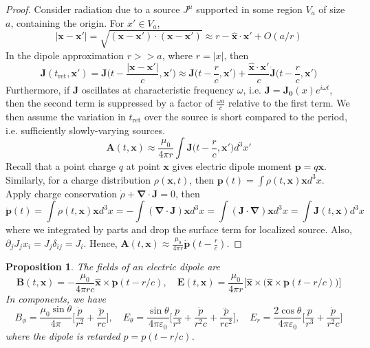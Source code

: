 \documentclass[a4paper]{article}
\theoremstyle{new}
\newtheorem{prop}{Proposition}[section]
\begin{document}
\begin{proof}
Consider radiation due to a source $J^\mu$ supported in some region $V_a$ of size $a$, containing the origin. For $x'\in V_a$,
$$|\mathbf{x}-\mathbf{x'}|=\sqrt{(\mathbf{x}-\mathbf{x'})\cdot(\mathbf{x}-\mathbf{x'})}\approx r-\mathbf{\hat{x}}\cdot\mathbf{x'}+O(a/r)$$
In the dipole approximation $r>>a$, where $r=|x|$, then
$$\mathbf{J}(t_{\text{ret}},\mathbf{x'})=\mathbf{J}\bigg(t-\frac{|\mathbf{x}-\mathbf{x'}|}{c},\mathbf{x'}\bigg)\approx\mathbf{J}\bigg(t-\frac{r}{c},\mathbf{x'}\bigg)+\frac{\mathbf{\hat{x}}\cdot\mathbf{x'}}{c}\mathbf{\dot{J}}\bigg(t-\frac{r}{c},\mathbf{x'}\bigg)$$
Furthermore, if $\mathbf{J}$ oscillates at characteristic frequency $\omega$, i.e. $\mathbf{J}=\mathbf{J_0}(x)e^{i\omega t}$, then the second term is suppressed by a factor of $\frac{\omega a}{c}$ relative to the first term. We then assume the variation in $t_{\text{ret}}$ over the source is short compared to the period, i.e. sufficiently slowly-varying sources. 
$$\mathbf{A}(t,\mathbf{x})\approx\frac{\mu_0}{4\pi r}\int\mathbf{J}\bigg(t-\frac{r}{c},\mathbf{x'}\bigg)d^3x'$$
Recall that a point charge $q$ at point $\mathbf{x}$ gives electric dipole moment $\mathbf{p}=q\mathbf{x}$. Similarly, for a charge distribution $\rho(\mathbf{x},t)$, then $\mathbf{p}(t)=\int\rho(t,\mathbf{x})\mathbf{x}d^3x$. Apply charge conservation $\dot{\rho}+\boldsymbol{\nabla}\cdot\mathbf{J}=0$, then
$$\mathbf{\dot{p}}(t)=\int\dot{\rho}(t,\mathbf{x})\mathbf{x}d^3x=-\int(\boldsymbol{\nabla}\cdot\mathbf{J})\mathbf{x}d^3x=\int(\mathbf{J}\cdot\boldsymbol{\nabla})\mathbf{x}d^3x=\int\mathbf{J}(t,\mathbf{x})d^3x$$
where we integrated by parts and drop the surface term for localized source. Also, $\partial_j J_jx_i=J_j\delta_{ij}=J_i$. Hence,  $\mathbf{A}(t,\mathbf{x})\approx\frac{\mu_0}{4\pi r}\mathbf{\dot{p}}(t-\frac{r}{c})$. 
\end{proof}
\begin{prop}
The fields of an electric dipole are
$$\mathbf{B}(t,\mathbf{x})=-\frac{\mu_0}{4\pi rc}\mathbf{\hat{x}}\times\mathbf{\ddot{p}}(t-r/c),\quad\mathbf{E}(t,\mathbf{x})=\frac{\mu_0}{4\pi r}\bigg[\mathbf{\hat{x}}\times\bigg(\mathbf{\hat{x}}\times\mathbf{\ddot{p}}(t-r/c)\bigg)\bigg]$$
In components, we have
$$B_\phi=\frac{\mu_0\sin\theta}{4\pi}\bigg[\frac{\dot{p}}{r^2}+\frac{\ddot{p}}{rc}\bigg],\quad E_\theta=\frac{\sin\theta}{4\pi\varepsilon_0}\bigg[\frac{p}{r^3}+\frac{\dot{p}}{r^2c}+\frac{\ddot{p}}{rc^2}\bigg],\quad E_r=\frac{2\cos\theta}{4\pi\varepsilon_0}\bigg[\frac{p}{r^3}+\frac{\dot{p}}{r^2c}\bigg]$$
where the dipole is retarded $p=p(t-r/c)$.
\end{prop}
\end{document}

